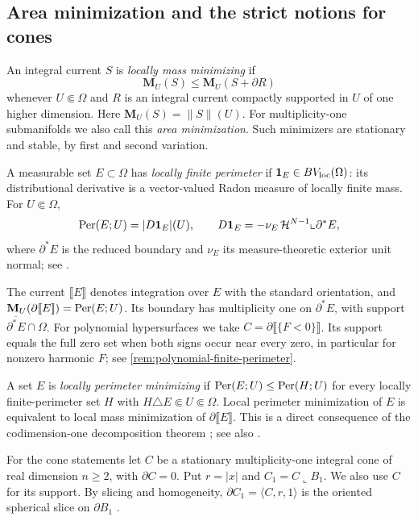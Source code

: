 \subsection{Area minimization and the strict notions for cones}
\label{sec:prelim-minimization}

An integral current \(S\) is \emph{locally mass minimizing} if
\[
 \mathbf M_U(S)\leq\mathbf M_U(S+\partial R)
\]
whenever \(U\Subset\Omega\) and \(R\) is an integral current compactly
supported in \(U\) of one higher dimension.  Here
\(\mathbf M_U(S)=\|S\|(U)\).  For multiplicity-one
submanifolds we also call this \emph{area minimization}.
Such minimizers are stationary and stable, by first and second variation.

A measurable set \(E\subset\Omega\) has \emph{locally finite perimeter}
if \(\mathbf 1_E\in BV_{\rm loc}(\Omega)\): its distributional derivative
is a vector-valued Radon measure of locally finite mass. For
\(U\Subset\Omega\),
\begin{equation}\label{eq:finite-perimeter-definition}
 \operatorname{Per}(E;U)=|D\mathbf 1_E|(U),\qquad
 D\mathbf 1_E=-\nu_E\,\mathcal H^{N-1}\llcorner\partial^*E,
\end{equation}
where \(\partial^*E\) is the reduced boundary and \(\nu_E\) its
measure-theoretic exterior unit normal; see \cite{Maggi12}.

The current \(\llbracket E\rrbracket\) denotes integration over \(E\)
with the standard orientation, and
\(\mathbf M_U(\partial[\![ E]\!])=\operatorname{Per}(E;U)\).
Its boundary has multiplicity one on \(\partial^*E\), with support
\(\overline{\partial^*E}\cap\Omega\). For polynomial hypersurfaces we take
\(C=\partial\llbracket\{F<0\}\rrbracket\).
Its support equals the full zero set when both signs occur near every
zero, in particular for nonzero harmonic \(F\);
see \cref{rem:polynomial-finite-perimeter}.

A set \(E\) is \emph{locally perimeter minimizing} if
\(\operatorname{Per}(E;U)\leq\operatorname{Per}(H;U)\) for every locally finite-perimeter set
\(H\) with \(H\triangle E\Subset U\Subset\Omega\).
Local perimeter minimization of \(E\) is equivalent to local mass
minimization of \(\partial\llbracket E\rrbracket\).  This is a direct
consequence of the codimension-one decomposition theorem
\cite[Theorem~27.6 and Corollary~27.8]{Simon83}; see also
\cite[Proposition~2.15]{DeLellis15}.

For the cone statements let \(C\) be a stationary multiplicity-one
integral cone of real dimension \(n\geq2\), with \(\partial C=0\).
Put \(r=|x|\) and \(C_1=C\llcorner B_1\).
We also use \(C\) for its support. By slicing and homogeneity,
\(\partial C_1=\langle C,r,1\rangle\) is the oriented spherical slice
on \(\partial B_1\) \cite[Lemma~28.5(2)]{Simon83}.

